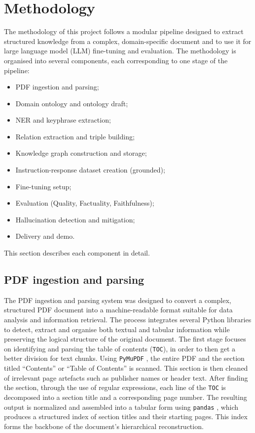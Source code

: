 \section{Methodology}

The methodology of this project follows a modular pipeline designed to extract structured knowledge from a complex, domain-specific document and to use it for large language model (LLM) fine-tuning and evaluation.
The methodology is organised into several components, each corresponding to one stage of the pipeline:
\begin{itemize}
\item PDF ingestion and parsing;
\item Domain ontology and ontology draft;
\item NER \cite{NER} and keyphrase extraction;
\item Relation extraction and triple building;
\item Knowledge graph construction and storage;
\item Instruction-response dataset creation (grounded);
\item Fine-tuning setup;
\item Evaluation (Quality, Factuality, Faithfulness);
\item Hallucination detection and mitigation;
\item Delivery and demo.
\end{itemize}
This section describes each component in detail.

\subsection{PDF ingestion and parsing}

The PDF ingestion and parsing system was designed to convert a complex, structured PDF document into a machine-readable format suitable for data analysis and information retrieval. The process integrates several Python libraries to detect, extract and organise both textual and tabular information while preserving the logical structure of the original document.
The first stage focuses on identifying and parsing the table of contents (\texttt{TOC}), in order to then get a better division for text chunks. Using \texttt{PyMuPDF} \cite{pymupdf}, the entire PDF and the section titled “Contents” or “Table of Contents” is scanned. This section is then cleaned of irrelevant page artefacts such as publisher names or header text. After finding the section, through the use of regular expressions, each line of the \texttt{TOC} is decomposed into a section title and a corresponding page number. The resulting output is normalized and assembled into a tabular form using \texttt{pandas} \cite{pandas}, which produces a structured index of section titles and their starting pages. This index forms the backbone of the document’s hierarchical reconstruction.

